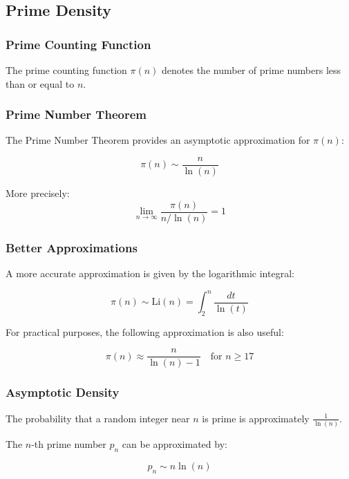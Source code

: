 \subsection{Prime Density}

\subsubsection{Prime Counting Function}

The prime counting function $\pi(n)$ denotes the number of prime numbers less than or equal to $n$.

\subsubsection{Prime Number Theorem}

The Prime Number Theorem provides an asymptotic approximation for $\pi(n)$:

\begin{equation}
    \pi(n) \sim \frac{n}{\ln(n)}
\end{equation}

More precisely:
\begin{equation}
    \lim_{n \to \infty} \frac{\pi(n)}{n/\ln(n)} = 1
\end{equation}

\subsubsection{Better Approximations}

A more accurate approximation is given by the logarithmic integral:

\begin{equation}
    \pi(n) \sim \text{Li}(n) = \int_2^n \frac{dt}{\ln(t)}
\end{equation}

For practical purposes, the following approximation is also useful:

\begin{equation}
    \pi(n) \approx \frac{n}{\ln(n) - 1} \quad \text{for } n \geq 17
\end{equation}

\subsubsection{Asymptotic Density}

The probability that a random integer near $n$ is prime is approximately $\frac{1}{\ln(n)}$.

The $n$-th prime number $p_n$ can be approximated by:

\begin{equation}
    p_n \sim n \ln(n)
\end{equation}
